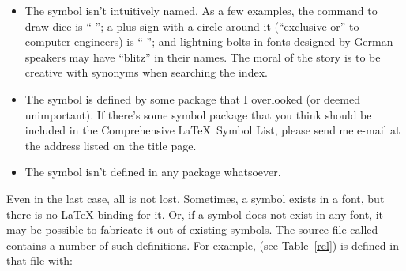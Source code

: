 \documentclass{article}
\newcommand{\doctitle}{Comprehensive \LaTeX\ Symbol List}  %
\newcommand{\pkgname}[1]{%
  \textsf{#1}\index{#1=\textsf{#1}}\index{packages>\textsf{#1}}}
\newcommand{\latex}{\LaTeX\index{LaTeX=\LaTeX}\xspace}
\newcommand{\latexE}{\LaTeXe\index{LaTeX2e=\LaTeXe}\xspace}
\newif\ifPI
\newcommand{\indexcommand}[1]{%
  \edef\sanitized{\expandafter\sanitize\string#1!!!}%
  \expandafter\index\expandafter{\sanitized=\string\verb+\string#1+}%
}
\def\cmd#1{\texttt{\string#1}\indexcommand{#1}}
\begin{document}
\begin{itemize}
  \item The symbol isn't intuitively named.  As a few examples, the
  command to draw dice is ``\cmd{\Cube}''; a plus sign with
  a circle around it (``exclusive or'' to computer
  engineers) is ``\cmd{\oplus}''; and lightning bolts in fonts designed
  by German speakers may have ``blitz'' in their names.  The moral of
  the story is to be creative with synonyms when searching the index.

  \item The symbol is defined by some package that I overlooked (or
  deemed unimportant).  If there's some symbol package that you think
  should be included in the \doctitle, please send me e-mail at the
  address listed on the title page.

  \item The symbol isn't defined in any package whatsoever.
\end{itemize}

\ifPI
  Even in the last case, all is not lost.  Sometimes, a symbol exists
  in a font, but there is no \latex{} binding for it.  For example,
  the PostScript\index{PostScript} Symbol\index{Symbol font} font
  contains a ``\Pisymbol{psy}{191}''\index{arrows} symbol, which may
  be useful for representing a carriage\index{carriage return} return,
  but there is no package for accessing that symbol (as far as I
  know).  To produce an unnamed symbol, you need to switch to the font
  explicitly with \latexE's low-level font commands~\cite{fntguide}
  and use \cmd{\char} to request a specific character number in the
  font.\footnote{\pkgname{pifont} defines a convenient \cmd{\Pisymbol}
  command for accessing symbols in PostScript\index{PostScript} fonts
  by number.  For example,
  ``\cmd{\Pisymbol}\texttt{\string{psy\string}\string{191\string}}''
  produces ``\Pisymbol{psy}{191}''.}

  Symbols that do not exist in any font can sometimes be fabricated out of
  existing symbols.  The \latexE{} source file called \fontdefdtx contains
  a number of such definitions.  For example, \cmd{\models} (see
  Table~\vref{rel}) is defined in that file with:
\else
  Even in the last case, all is not lost.  Sometimes, a symbol exists in a
  font, but there is no \latex{} binding for it.  Or, if a symbol does not
  exist in any font, it may be possible to fabricate it out of existing
  symbols.  The \latexE{} source file called \fontdefdtx contains a number
  of such definitions.  For example, \cmd{\models} (see Table~\vref{rel})
  is defined in that file with:
\fi    %
\end{document}
